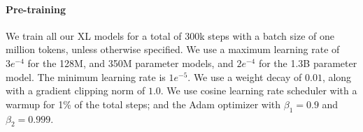 \paragraph{Pre-training}
We train all our XL models for a total of 300k steps with a batch size of one million tokens, unless otherwise specified.
We use a maximum learning rate of $3e^{-4}$ for the 128M, and 350M parameter models, and $2e^{-4}$ for the 1.3B parameter model. The minimum learning rate is $1e^{-5}$.  We use a weight decay of $0.01$, along with a gradient clipping norm of $1.0$.
We use cosine learning rate scheduler with a warmup for 1\% of the total steps;
 and the Adam optimizer with $\beta_1=0.9$ and $\beta_2=0.999$.

